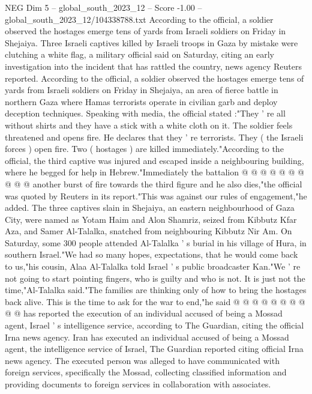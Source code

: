 \begin{textsample}{NEG Dim 5 – global\_south\_2023\_12 – Score -1.00 – global\_south\_2023\_12/104338788.txt}  \label{ex:f5_neg_350}
According to the official, a soldier observed the hostages emerge tens of yards from Israeli soldiers on Friday in Shejaiya.
Three Israeli captives killed by Israeli troops in Gaza by mistake were clutching a white flag, a military official said on Saturday, citing an early investigation into the incident that has rattled the country, news agency Reuters reported.
According to the official, a soldier observed the hostages emerge tens of yards from Israeli soldiers on Friday in Shejaiya, an area of fierce battle in northern Gaza where Hamas terrorists operate in civilian garb and deploy deception techniques.
Speaking with media, the official stated :"They ' re all without shirts and they have a stick with a white cloth on it.
The soldier feels threatened and opens fire.
He declares that they ' re terrorists.
They ( the Israeli forces ) open fire.
Two ( hostages ) are killed immediately."According to the official, the third captive was injured and escaped inside a neighbouring building, where he begged for help in Hebrew."Immediately the battalion @ @ @ @ @ @ @ @ @ @ another burst of fire towards the third figure and he also dies,"the official was quoted by Reuters in its report."This was against our rules of engagement,"he added.
The three captives slain in Shejaiya, an eastern neighbourhood of Gaza City, were named as Yotam Haim and Alon Shamriz, seized from Kibbutz Kfar Aza, and Samer Al-Talalka, snatched from neighbouring Kibbutz Nir Am.
On Saturday, some 300 people attended Al-Talalka ' s burial in his village of Hura, in southern Israel."We had so many hopes, expectations, that he would come back to us,"his cousin, Alaa Al-Talalka told Israel ' s public broadcaster Kan."We ' re not going to start pointing fingers, who is guilty and who is not.
It is just not the time,"Al-Talalka said."The families are thinking only of how to bring the hostages back alive.
This is the time to ask for the war to end,"he said @ @ @ @ @ @ @ @ @ @ has reported the execution of an individual accused of being a Mossad agent, Israel ' s intelligence service, according to The Guardian, citing the official Irna news agency.
Iran has executed an individual accused of being a Mossad agent, the intelligence service of Israel, The Guardian reported citing official Irna news agency.
The executed person was alleged to have communicated with foreign services, specifically the Mossad, collecting classified information and providing documents to foreign services in collaboration with associates.

\end{textsample}
